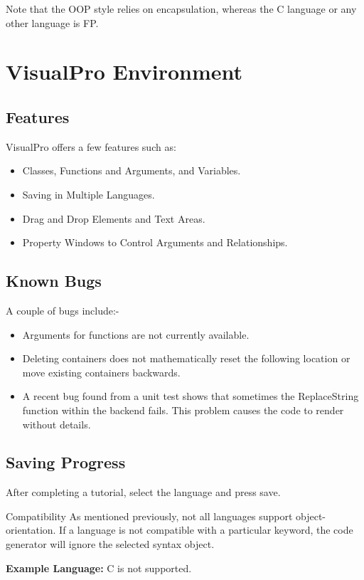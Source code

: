 \documentclass[10pt]{article}
\begin{document}
    Note that the OOP style relies on encapsulation, whereas the C language or any other language is FP.

\newpage
\section{VisualPro Environment}
\label{sec:vp-env}
    \subsection{Features}
        VisualPro offers a few features such as:
        \begin{itemize}
            \item Classes, Functions and Arguments, and Variables.
            \item Saving in Multiple Languages.
            \item Drag and Drop Elements and Text Areas.
            \item Property Windows to Control Arguments and Relationships.
        \end{itemize}

    \subsection{Known Bugs}
        A couple of bugs include:-
        \begin{itemize}
            \item Arguments for functions are not currently available.
            \item Deleting containers does not mathematically reset the following location or move existing containers backwards.
            \item A recent bug found from a unit test shows that sometimes the ReplaceString function within the backend fails. This problem causes the code to render without details.
        \end{itemize}

    \subsection{Saving Progress}
        After completing a tutorial, select the language and press save.

        \begin{tip}{Compatibility}
            As mentioned previously, not all languages support object-orientation. If a language is not compatible with a particular keyword, the code generator will ignore the selected syntax object.

            \textbf{Example Language:} C is not supported.
        \end{tip}
\end{document}

